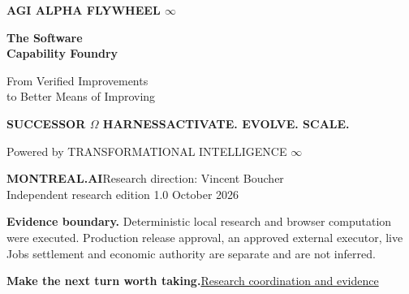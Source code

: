 \documentclass[11pt,a4paper]{article}
\begin{document}
\thispagestyle{empty}
{\sffamily\small\bfseries\color{FoundryPurple} AGI ALPHA FLYWHEEL \hfill $\infty$}
\vspace{7mm}

{\sffamily\fontsize{30}{34}\selectfont\bfseries\color{FoundryPurple}
The Software\\Capability Foundry\par}
\vspace{4mm}
{\Large From Verified Improvements\\to Better Means of Improving\par}
\vspace{5mm}
{\sffamily\bfseries SUCCESSOR $\Omega$ HARNESS\quad ACTIVATE. EVOLVE. SCALE.\par}
{\small Powered by TRANSFORMATIONAL INTELLIGENCE $\infty$\par}
\vspace{5mm}
\textbf{MONTREAL.AI}\quad Research direction: Vincent Boucher\\
Independent research edition 1.0 October 2026

\vspace{5mm}
\begin{abstract}
\noindent An autonomous improvement system should leave behind a better means of doing the next useful job. That claim requires more than a fast patch: a retained instrument must transfer, help form a distinct later capability, and justify its complete cost against competent alternatives. We study a concrete source-verification bottleneck in the public AGI ALPHA ecosystem. A bounded Git snapshot reader replaces repeated per-file processes while preserving exact committed bytes, regular-file and size checks, and original downstream output checks. It transfers from companion-package verification to gallery-worker reconstruction. A deterministic constructor then binds the accepted reader into a distinct archive-drift diagnostician. A prospective campaign freezes source, comparators, generation rules, budgets and analysis before creating 24 fresh source-derived repository instances. Seven treatments include a direct native specialist, an asset-free capable controller, ordinary saved tooling, an equally enabled conventional builder, the proposed flywheel, an independently written equivalent, and exact reconstruction. \AbstractResult{} Complete research investment, monetary payback, autonomous algorithm discovery and acceleration remain unestablished. The contribution is an executed, auditable separation of useful engineering, capability transfer and improvement-process claims, with reviewable patches, raw failures, an existing-workbench browser demonstration and a complete reproduction package.
\end{abstract}
\vspace{2mm}
\colorbox{FoundryLilac}{\parbox{\dimexpr\textwidth-2\fboxsep}{\small
\textbf{Evidence boundary.} Deterministic local research and browser computation were executed. Production release approval, an approved external executor, live Jobs settlement and economic authority are separate and are not inferred.}}
\vfill
\textbf{Make the next turn worth taking.}\hfill\small\href{https://github.com/MontrealAI/AGI-Alpha-Agent-v0/issues/4850}{Research coordination and evidence}
\clearpage
\end{document}
